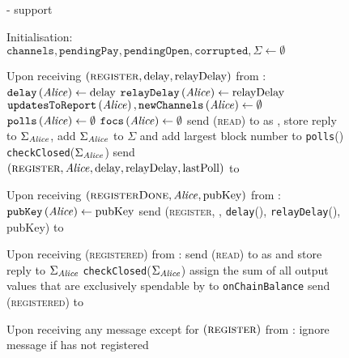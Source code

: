   \begin{figure}[H]
    \begin{systembox}{\fpaynet{} - support}
      \begin{algorithmic}[1]
        \State Initialisation:
        \Indent
          \State $\mathtt{channels}, \mathtt{pendingPay}, \mathtt{pendingOpen},
          \mathtt{corrupted}, \Sigma \gets \emptyset$
        \EndIndent
        \Statex

        \State Upon receiving $\left(\textsc{register}, \mathrm{delay},
        \mathrm{relayDelay}\right)$ from \alice:
        \Indent
          \State $\mathtt{delay}\left(\mathit{Alice}\right) \gets \mathrm{delay}$
          \State $\mathtt{relayDelay}\left(\mathit{Alice}\right) \gets
          \mathrm{relayDelay}$
          \State $\mathtt{updatesToReport}\left(\mathit{Alice}\right),
          \mathtt{newChannels}\left(\mathit{Alice}\right) \gets \emptyset$
          \State $\mathtt{polls}\left(\mathit{Alice}\right) \gets \emptyset$
          \State $\mathtt{focs}\left(\mathit{Alice}\right) \gets \emptyset$
          \State send (\textsc{read}) to \ledger{} as \alice{}, store reply to
          $\Sigma_{\mathit{Alice}}$, add $\Sigma_{\mathit{Alice}}$ to $\Sigma$ and add largest
          block number to \texttt{polls}(\alice)
          \label{alg:fpaynet:support:lastpoll}
          \State \texttt{checkClosed}($\Sigma_{\mathit{Alice}}$)
          \State send $\left(\textsc{register}, \mathit{Alice}, \mathrm{delay},
          \mathrm{relayDelay}, \mathrm{lastPoll}\right)$ to \simulator
        \EndIndent
        \Statex

        \State Upon receiving $\left(\textsc{registerDone}, \mathit{Alice},
        \mathrm{pubKey}\right)$ from \simulator:
        \Indent
          \State $\mathtt{pubKey}\left(\mathit{Alice}\right) \gets \mathrm{pubKey}$
          \State send (\textsc{register}, \alice, \texttt{delay}(\alice),
          \texttt{relayDelay}(\alice), pubKey) to \alice
        \EndIndent
        \Statex

        \State Upon receiving (\textsc{registered}) from \alice:
        \Indent
          \State send (\textsc{read}) to \ledger{} as \alice{} and store reply
          to $\Sigma_{\mathit{Alice}}$
          \State \texttt{checkClosed}($\Sigma_{\mathit{Alice}}$)
          \State assign the sum of all output values that are exclusively
          spendable by \alice{} to \texttt{onChainBalance}
          \State send (\textsc{registered}) to \alice
        \EndIndent
        \Statex

        \State Upon receiving any message except for
        $\left(\textsc{register}\right)$ from \alice:
        \Indent
          \State ignore message if \alice{} has not registered
          \label{alg:fpaynet:support:unreg}
        \EndIndent
        \Statex


\end{algorithmic}
\end{systembox}
\end{figure}
